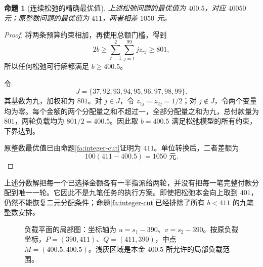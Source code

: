 \documentclass[UTF8,a4paper]{ctexbook}
\newtheorem{proposition}[theorem]{命题}
\theoremstyle{definition}
\numberwithin{equation}{chapter}
\newcommand{\1}{\mathbf{1}}
\begin{document}
\begin{proposition}[连续松弛的精确最优值]\label{fa:relaxation}
上述松弛问题的最优值为 $400.5$，对应 $40050$ 元；原整数问题的最优值为 $411$，两者相差 $1050$ 元。
\end{proposition}

\begin{proof}
将两条预算约束相加，再使用总额门槛，得到
\[
2b\ge\sum_{r=1}^2\sum_{j=1}^{99}jz_{rj}\ge801,
\]
所以任何松弛可行解都满足 $b\ge400.5$。

令
\[
J=\{37,92,93,94,95,96,97,98,99\}.
\]
其基数为九，加权和为 $801$。对 $j\in J$，令 $z_{1j}=z_{2j}=1/2$；对 $j\notin J$，令两个变量均为零。每个金额的两个分配量之和不超过一，全部分配量之和为九，总付款量为 $801$，两轮负载均为 $801/2=400.5$。因此取 $b=400.5$ 满足松弛模型的所有约束，下界达到。

原整数最优值已由命题\ref{fa:integer-cut}证明为 $411$。单位转换后，二者差额为
\[
100(411-400.5)=1050\text{ 元}.
\]
\end{proof}

上述分数解把每一个已选择金额各有一半指派给两轮，并没有把每一笔完整付款分配到唯一一轮。它因此不是九笔任务的执行方案。即使把松弛本金向上取到 $401$，仍然不能恢复二元分配条件；命题\ref{fa:integer-cut}已经排除了所有 $b<411$ 的九笔整数安排。

\begin{figure}[htbp]
\centering
{}
\caption{负载平面的局部图：坐标轴为 $u=s_1-390$、$v=s_2-390$。按原负载坐标，$P=(390,411)$、$Q=(411,390)$，中点 $M=(400.5,400.5)$。浅灰区域是本金 $400.5$ 所允许的局部负载范围。}
\label{fa:convexification-figure}
\end{figure}
\end{document}
